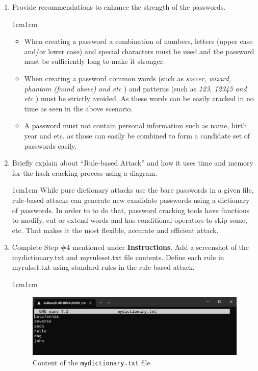 \documentclass[11pt,letterpaper]{article}
\newenvironment{answer}{\em \color{blue} \begin{adjustwidth}{1cm}{1cm}}{\end{adjustwidth}}
\begin{document}
\begin{enumerate}
		\item Provide recommendations to enhance the strength of the passwords.
		
		\begin{answer}
		\begin{itemize}
			\item When creating a password a combination of numbers, letters (upper case and/or lower case)  and special characters must be used and the password must be sufficiently long to make it stronger.				
			
			\item When creating a password common words (such as \textit{soccer, wizard, phantom (found above)  and etc} ) and patterns (such as \textit{123, 12345 and etc} ) must be strictly avoided. As these words can be easily cracked in no time as seen in the above scenario.					
			
			\item A password must not contain personal information such as name, birth year and etc. as those can easily be combined to form a candidate set of passwords easily.
		\end{itemize}
		\end{answer}
		
		\item Briefly explain about ``Rule-based Attack'' and how it uses time and memory for the hash cracking process using a diagram.
		
		\begin{answer}
			While pure dictionary attacks use the bare passwords in a given file, rule-based attacks can generate new candidate passwords using a dictionary of passwords. In order to to do that, password cracking tools have functions to modify, cut or extend words and has conditional operators to skip some, etc. That makes it the most flexible, accurate and efficient attack.
		\end{answer}
		
		\item Complete Step \#4 mentioned under \textbf{Instructions}. Add a screenshot of the mydictionary.txt and myruleset.txt file contents. Define each rule in myrulset.txt using standard rules in the rule-based attack.
		
		\begin{answer}
			\begin{figure}[h]
				\centering
				\includegraphics[width=0.7\columnwidth]{images/mydict}
				\caption{Content of the {\tt mydictionary.txt} file} \label{fig:mydict}
			\end{figure}
		

\end{answer}
\end{enumerate}
\end{document}
